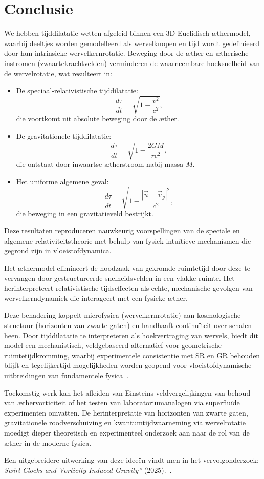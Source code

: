 \section{Conclusie}

We hebben tijddilatatie-wetten afgeleid binnen een 3D Euclidisch æthermodel, waarbij deeltjes worden gemodelleerd als wervelknopen en tijd wordt gedefinieerd door hun intrinsieke wervelkernrotatie. Beweging door de æther en ætherische instromen (zwaartekrachtvelden) verminderen de waarneembare hoeksnelheid van de wervelrotatie, wat resulteert in:

\begin{itemize}
    \item De speciaal-relativistische tijddilatatie:
    \[
        \frac{d\tau}{dt} = \sqrt{1 - \frac{v^2}{c^2}},
    \]
    die voortkomt uit absolute beweging door de æther.

    \item De gravitationele tijddilatatie:
    \[
        \frac{d\tau}{dt} = \sqrt{1 - \frac{2GM}{rc^2}},
    \]
    die ontstaat door inwaartse ætherstroom nabij massa $M$.

    \item Het uniforme algemene geval:
    \[
        \frac{d\tau}{dt} = \sqrt{1 - \frac{|\vec{u} - \vec{v}_g|^2}{c^2}},
    \]
    die beweging in een gravitatieveld bestrijkt.
\end{itemize}

Deze resultaten reproduceren nauwkeurig voorspellingen van de speciale en algemene relativiteitstheorie met behulp van fysiek intuïtieve mechanismen die gegrond zijn in vloeistofdynamica.

Het æthermodel elimineert de noodzaak van gekromde ruimtetijd door deze te vervangen door gestructureerde snelheidsvelden in een vlakke ruimte. Het herinterpreteert relativistische tijdseffecten als echte, mechanische gevolgen van wervelkerndynamiek die interageert met een fysieke æther.

Deze benadering koppelt microfysica (wervelkernrotatie) aan kosmologische structuur (horizonten van zwarte gaten) en handhaaft continuïteit over schalen heen. Door tijddilatatie te interpreteren als hoekvertraging van wervels, biedt dit model een mechanistisch, veldgebaseerd alternatief voor geometrische ruimtetijdkromming, waarbij experimentele consistentie met SR en GR behouden blijft en tegelijkertijd mogelijkheden worden geopend voor vloeistofdynamische uitbreidingen van fundamentele fysica~\cite{Winterberg2002-PlanckÆther, Schiller2022-maxforce}.

Toekomstig werk kan het afleiden van Einsteins veldvergelijkingen van behoud van æthervorticiteit of het testen van laboratoriumanalogen via superfluïde experimenten omvatten. De herinterpretatie van horizonten van zwarte gaten, gravitationele roodverschuiving en kwantumtijdwaarneming via wervelrotatie moedigt dieper theoretisch en experimenteel onderzoek aan naar de rol van de æther in de moderne fysica.

Een uitgebreidere uitwerking van deze ideeën vindt men in het vervolgonderzoek: \textit{\grqq Swirl Clocks and Vorticity-Induced Gravity\textquotedblright} (2025).~\cite{vam2025unified}.
